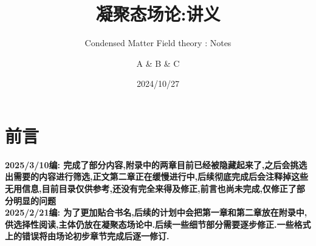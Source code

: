 \documentclass[lang=cn,newtx,10pt,scheme=chinese,thmcnt=section]{elegantbook}
\title{凝聚态场论:讲义}
\subtitle{Condensed Matter Field theory : Notes}
\author{A \& B \& C}
\institute{Group 530}
\date{2024/10/27}
\begin{document}
\maketitle
\frontmatter

\tableofcontents

\mainmatter










\chapter*{前言}
\textbf{2025/3/10编: 完成了部分内容,附录中的两章目前已经被隐藏起来了,之后会挑选出需要的内容进行筛选,正文第二章正在缓慢进行中,后续彻底完成后会注释掉这些无用信息,目前目录仅供参考,还没有完全来得及修正,前言也尚未完成,仅修正了部分明显的问题}\\

\textbf{2025/2/21编: 为了更加贴合书名,后续的计划中会把第一章和第二章放在附录中,供选择性阅读,主体仍放在凝聚态场论中.后续一些细节部分需要逐步修正.一些格式上的错误将由场论初步章节完成后逐一修订.}\\
\end{document}
